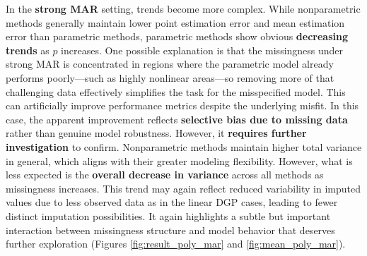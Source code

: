 \documentclass[12pt,oneside]{amsart}
\theoremstyle{definition}
\theoremstyle{remark}
\numberwithin{equation}{section}
\begin{document}
In the \textbf{strong MAR} setting, trends become more complex. While nonparametric methods generally maintain lower point estimation error and mean estimation error than parametric methods, parametric methods show obvious \textbf{decreasing trends} as $p$ increases. One possible explanation is that the missingness under strong MAR is concentrated in regions where the parametric model already performs poorly—such as highly nonlinear areas—so removing more of that challenging data effectively simplifies the task for the misspecified model. This can artificially improve performance metrics despite the underlying misfit. In this case, the apparent improvement reflects \textbf{selective bias due to missing data} rather than genuine model robustness. However, it \textbf{requires further investigation} to confirm. Nonparametric methods maintain higher total variance in general, which aligns with their greater modeling flexibility. However, what is less expected is the \textbf{overall decrease in variance} across all methods as missingness increases. This trend may again reflect reduced variability in imputed values due to less observed data as in the linear DGP cases, leading to fewer distinct imputation possibilities. It again highlights a subtle but important interaction between missingness structure and model behavior that deserves further exploration (Figures \ref{fig:result_poly_mar} and  \ref{fig:mean_poly_mar}).
\end{document}
